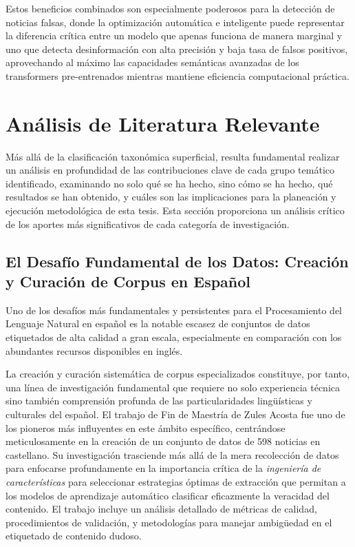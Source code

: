 Estos beneficios combinados son especialmente poderosos para la detección de noticias falsas, donde la optimización automática e inteligente puede representar la diferencia crítica entre un modelo que apenas funciona de manera marginal y uno que detecta desinformación con alta precisión y baja tasa de falsos positivos, aprovechando al máximo las capacidades semánticas avanzadas de los transformers pre-entrenados mientras mantiene eficiencia computacional práctica.

\section{Análisis de Literatura Relevante}
\label{sec:analisis_tematico}

Más allá de la clasificación taxonómica superficial, resulta fundamental realizar un análisis en profundidad de las contribuciones clave de cada grupo temático identificado, examinando no solo qué se ha hecho, sino cómo se ha hecho, qué resultados se han obtenido, y cuáles son las implicaciones para la planeación y ejecución metodológica de esta tesis. Esta sección proporciona un análisis crítico de los aportes más significativos de cada categoría de investigación.

\subsection{El Desafío Fundamental de los Datos: Creación y Curación de Corpus en Español}

Uno de los desafíos más fundamentales y persistentes para el Procesamiento del Lenguaje Natural en español es la notable escasez de conjuntos de datos etiquetados de alta calidad a gran escala, especialmente en comparación con los abundantes recursos disponibles en inglés.

La creación y curación sistemática de corpus especializados constituye, por tanto, una línea de investigación fundamental que requiere no solo experiencia técnica sino también comprensión profunda de las particularidades lingüísticas y culturales del español. El trabajo de Fin de Maestría de Zules Acosta \cite{acosta2019construccion} fue uno de los pioneros más influyentes en este ámbito específico, centrándose meticulosamente en la creación de un conjunto de datos de 598 noticias en castellano. Su investigación trasciende más allá de la mera recolección de datos para enfocarse profundamente en la importancia crítica de la \textit{ingeniería de características} para seleccionar estrategias óptimas de extracción que permitan a los modelos de aprendizaje automático clasificar eficazmente la veracidad del contenido. El trabajo incluye un análisis detallado de métricas de calidad, procedimientos de validación, y metodologías para manejar ambigüedad en el etiquetado de contenido dudoso.

